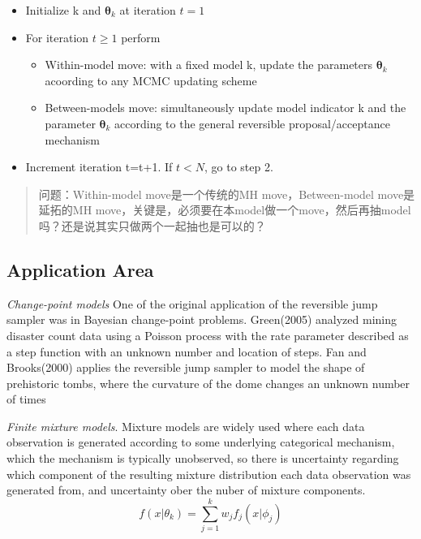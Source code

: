 \documentclass[
]{book}
\providecommand{\tightlist}{%
  \setlength{\itemsep}{0pt}\setlength{\parskip}{0pt}}
\theoremstyle{definition}
\theoremstyle{definition}
\theoremstyle{definition}
\theoremstyle{remark}
\begin{document}
\begin{itemize}
\tightlist
\item
  Initialize k and \(\boldsymbol \theta_k\) at iteration \(t=1\)
\item
  For iteration \(t\geq 1\) perform

  \begin{itemize}
  \tightlist
  \item
    Within-model move: with a fixed model k, update the parameters \(\boldsymbol \theta_k\) acoording to any MCMC updating scheme
  \item
    Between-models move: simultaneously update model indicator k and the parameter \(\boldsymbol \theta_k\) according to the general reversible proposal/acceptance mechanism\\
  \end{itemize}
\item
  Increment iteration t=t+1. If \(t<N\), go to step 2.
\end{itemize}

\begin{quote}
问题：Within-model move是一个传统的MH move，Between-model move是延拓的MH move，关键是，必须要在本model做一个move，然后再抽model吗？还是说其实只做两个一起抽也是可以的？
\end{quote}

\hypertarget{application-area}{%
\subsection{Application Area}\label{application-area}}

\emph{Change-point models} One of the original application of the reversible jump sampler was in Bayesian change-point problems. Green(2005) analyzed mining disaster count data using a Poisson process with the rate parameter described as a step function with an unknown number and location of steps. Fan and Brooks(2000) applies the reversible jump sampler to model the shape of prehistoric tombs, where the curvature of the dome changes an unknown number of times

\emph{Finite mixture models}. Mixture models are widely used where each data observation is generated according to some underlying categorical mechanism, which the mechanism is typically unobserved, so there is uncertainty regarding which component of the resulting mixture distribution each data observation was generated from, and uncertainty ober the nuber of mixture components.
\[
f(x|\theta_k)=\sum_{j=1}^k w_jf_j(x|\phi_j)
\]
\end{document}
